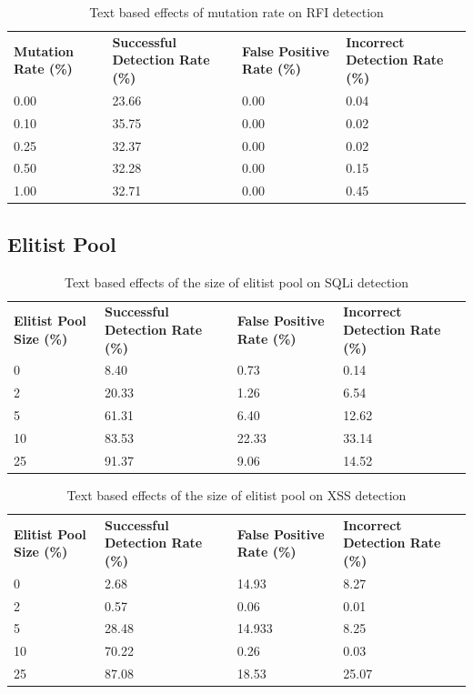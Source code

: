 \begin{appendices}
\begin{table}[h]
	\centering
	\begin{tabular}{|p{1.5in}|p{1in}|p{1in}|p{1in}|}
	\hline
	\textbf{Mutation Rate (\%)} & \textbf{Successful Detection Rate (\%)} & \textbf{False Positive Rate (\%)} & \textbf{Incorrect Detection Rate (\%)}  \\
	\hhline{|=|=|=|=|}
	0.00 & 23.66 & 0.00 & 0.04 \\
	\hline
	0.10 & 35.75 & 0.00 & 0.02 \\
	\hline
	0.25 & 32.37 & 0.00 & 0.02 \\
	\hline
	0.50 & 32.28 & 0.00 & 0.15 \\
	\hline
	1.00 & 32.71 & 0.00 & 0.45 \\
	\hline
	\end{tabular}
	\caption{Text based effects of mutation rate on RFI detection}
\end{table}

\newpage
\subsection{Elitist Pool}

\begin{table}[h]
	\centering
	\begin{tabular}{|p{1.5in}|p{1in}|p{1in}|p{1in}|}
	\hline
	\textbf{Elitist Pool Size (\%)} & \textbf{Successful Detection Rate (\%)} & \textbf{False Positive Rate (\%)} & \textbf{Incorrect Detection Rate (\%)}  \\
	\hhline{|=|=|=|=|}
	0 & 8.40 & 0.73 & 0.14 \\
	\hline
	2 & 20.33 & 1.26 & 6.54 \\
	\hline
	5 & 61.31 & 6.40 & 12.62 \\
	\hline
	10 & 83.53 & 22.33 & 33.14 \\
	\hline
	25 & 91.37 & 9.06 & 14.52 \\
	\hline
	\end{tabular}
	\caption{Text based effects of the size of elitist pool on SQLi detection}
\end{table}

\begin{table}[h]
	\centering
	\begin{tabular}{|p{1.5in}|p{1in}|p{1in}|p{1in}|}
	\hline
	\textbf{Elitist Pool Size (\%)} & \textbf{Successful Detection Rate (\%)} & \textbf{False Positive Rate (\%)} & \textbf{Incorrect Detection Rate (\%)}  \\
	\hhline{|=|=|=|=|}
	0 & 2.68 & 14.93 & 8.27 \\
	\hline
	2 & 0.57 & 0.06 & 0.01 \\
	\hline
	5 & 28.48 & 14.933 & 8.25 \\
	\hline
	10 & 70.22 & 0.26 & 0.03 \\
	\hline
	25 & 87.08 & 18.53 & 25.07 \\
	\hline
	\end{tabular}
	\caption{Text based effects of the size of elitist pool on XSS detection}
\end{table}


\end{appendices}
